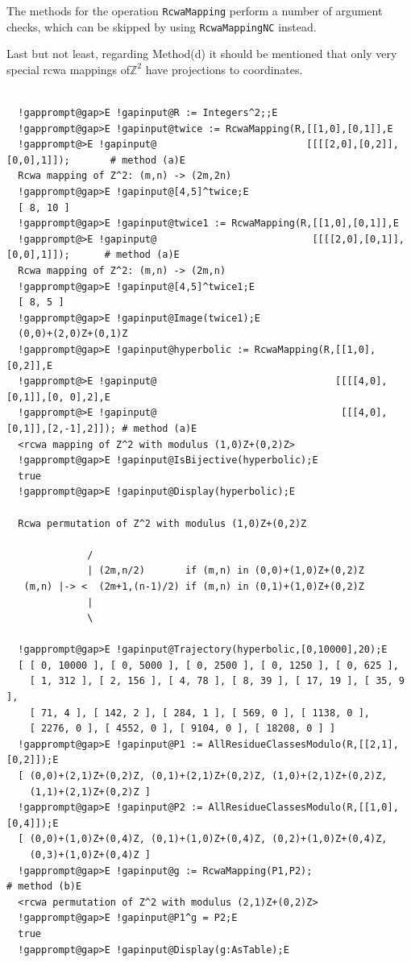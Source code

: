 \documentclass[a4paper,11pt]{report}
\begin{document}
{{{ The methods for the operation \texttt{RcwaMapping} perform a number of argument checks, which can be skipped by using \texttt{RcwaMappingNC} instead. 

 Last but not least, regarding Method{\nobreakspace}(d) it should be mentioned
that only very special rcwa mappings of{\nobreakspace}${\ensuremath{\mathbb Z}}^2$ have projections to coordinates. 
\begin{Verbatim}[commandchars=!@E,fontsize=\small,frame=single,label=Example]
  
  !gapprompt@gap>E !gapinput@R := Integers^2;;E
  !gapprompt@gap>E !gapinput@twice := RcwaMapping(R,[[1,0],[0,1]],E
  !gapprompt@>E !gapinput@                          [[[[2,0],[0,2]],[0,0],1]]);       # method (a)E
  Rcwa mapping of Z^2: (m,n) -> (2m,2n)
  !gapprompt@gap>E !gapinput@[4,5]^twice;E
  [ 8, 10 ]
  !gapprompt@gap>E !gapinput@twice1 := RcwaMapping(R,[[1,0],[0,1]],E
  !gapprompt@>E !gapinput@                           [[[[2,0],[0,1]],[0,0],1]]);      # method (a)E
  Rcwa mapping of Z^2: (m,n) -> (2m,n)
  !gapprompt@gap>E !gapinput@[4,5]^twice1;E
  [ 8, 5 ]
  !gapprompt@gap>E !gapinput@Image(twice1);E
  (0,0)+(2,0)Z+(0,1)Z
  !gapprompt@gap>E !gapinput@hyperbolic := RcwaMapping(R,[[1,0],[0,2]],E
  !gapprompt@>E !gapinput@                               [[[[4,0],[0,1]],[0, 0],2],E
  !gapprompt@>E !gapinput@                                [[[4,0],[0,1]],[2,-1],2]]); # method (a)E
  <rcwa mapping of Z^2 with modulus (1,0)Z+(0,2)Z>
  !gapprompt@gap>E !gapinput@IsBijective(hyperbolic);E
  true
  !gapprompt@gap>E !gapinput@Display(hyperbolic);E
  
  Rcwa permutation of Z^2 with modulus (1,0)Z+(0,2)Z
  
              /
              | (2m,n/2)       if (m,n) in (0,0)+(1,0)Z+(0,2)Z
   (m,n) |-> <  (2m+1,(n-1)/2) if (m,n) in (0,1)+(1,0)Z+(0,2)Z
              |
              \
  
  !gapprompt@gap>E !gapinput@Trajectory(hyperbolic,[0,10000],20);E
  [ [ 0, 10000 ], [ 0, 5000 ], [ 0, 2500 ], [ 0, 1250 ], [ 0, 625 ], 
    [ 1, 312 ], [ 2, 156 ], [ 4, 78 ], [ 8, 39 ], [ 17, 19 ], [ 35, 9 ], 
    [ 71, 4 ], [ 142, 2 ], [ 284, 1 ], [ 569, 0 ], [ 1138, 0 ], 
    [ 2276, 0 ], [ 4552, 0 ], [ 9104, 0 ], [ 18208, 0 ] ]
  !gapprompt@gap>E !gapinput@P1 := AllResidueClassesModulo(R,[[2,1],[0,2]]);E
  [ (0,0)+(2,1)Z+(0,2)Z, (0,1)+(2,1)Z+(0,2)Z, (1,0)+(2,1)Z+(0,2)Z,
    (1,1)+(2,1)Z+(0,2)Z ]
  !gapprompt@gap>E !gapinput@P2 := AllResidueClassesModulo(R,[[1,0],[0,4]]);E
  [ (0,0)+(1,0)Z+(0,4)Z, (0,1)+(1,0)Z+(0,4)Z, (0,2)+(1,0)Z+(0,4)Z,
    (0,3)+(1,0)Z+(0,4)Z ]
  !gapprompt@gap>E !gapinput@g := RcwaMapping(P1,P2);                                 # method (b)E
  <rcwa permutation of Z^2 with modulus (2,1)Z+(0,2)Z>
  !gapprompt@gap>E !gapinput@P1^g = P2;E
  true
  !gapprompt@gap>E !gapinput@Display(g:AsTable);E
  

\end{Verbatim}}}}
\end{document}
